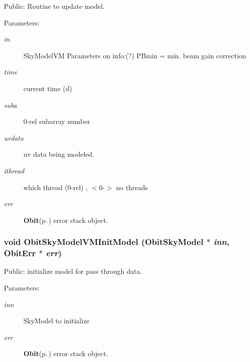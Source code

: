 Public: Routine to update model. 

\begin{Desc}
\item[Parameters:]
\begin{description}
\item[{\em in}]Sky\-Model\-VM Parameters on info:(?) PBmin = min. beam gain correction \item[{\em time}]current time (d) \item[{\em suba}]0-rel subarray number \item[{\em uvdata}]uv data being modeled. \item[{\em ithread}]which thread (0-rel) , $<$0-$>$ no threads \item[{\em err}]{\bf Obit}{\rm (p.\,\pageref{structObit})} error stack object. \end{description}
\end{Desc}
\subsubsection{\setlength{\rightskip}{0pt plus 5cm}void Obit\-Sky\-Model\-VMInit\-Model ({\bf Obit\-Sky\-Model} $\ast$ {\em inn}, {\bf Obit\-Err} $\ast$ {\em err})}\label{ObitSkyModelVMBeam_8h_a9}


Public: initialize model for pass through data. 

\begin{Desc}
\item[Parameters:]
\begin{description}
\item[{\em inn}]Sky\-Model to initialize \item[{\em err}]{\bf Obit}{\rm (p.\,\pageref{structObit})} error stack object. \end{description}
\end{Desc}
